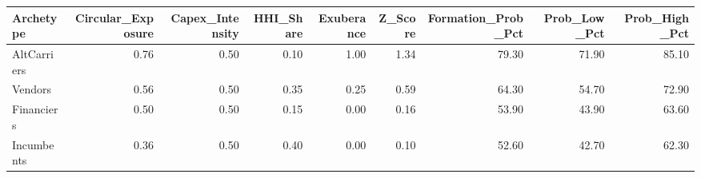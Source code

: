 \begin{tabular}{lrrrrrrrr}
\toprule
Archetype & Circular_Exposure & Capex_Intensity & HHI_Share & Exuberance & Z_Score & Formation_Prob_Pct & Prob_Low_Pct & Prob_High_Pct \\
\midrule
AltCarriers & 0.76 & 0.50 & 0.10 & 1.00 & 1.34 & 79.30 & 71.90 & 85.10 \\
Vendors & 0.56 & 0.50 & 0.35 & 0.25 & 0.59 & 64.30 & 54.70 & 72.90 \\
Financiers & 0.50 & 0.50 & 0.15 & 0.00 & 0.16 & 53.90 & 43.90 & 63.60 \\
Incumbents & 0.36 & 0.50 & 0.40 & 0.00 & 0.10 & 52.60 & 42.70 & 62.30 \\
\bottomrule
\end{tabular}

